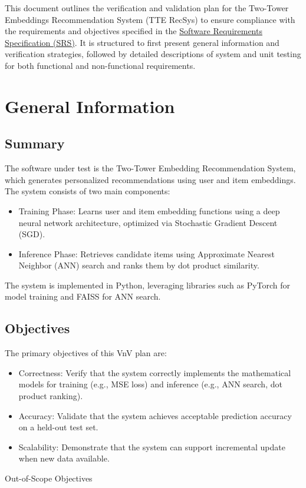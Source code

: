 \documentclass[12pt, titlepage]{article}
\begin{document}
\newpage

\nocite{*}
This document outlines the verification and validation plan for the Two-Tower Embeddings Recommendation System (TTE RecSys) to ensure compliance with the requirements and objectives specified in the \href{https://github.com/V-AS/Two-tower-recommender-system/blob/main/docs/SRS/SRS.pdf}{Software Requirements Specification (SRS)}. It is structured to first present general information and verification strategies, followed by detailed descriptions of system and unit testing for both functional and non-functional requirements.

\section{General Information}

\subsection{Summary}

The software under test is the Two-Tower Embedding Recommendation System, which generates personalized recommendations using user and item embeddings. The system consists of two main components:
\begin{itemize}
  \item Training Phase: Learns user and item embedding functions using a deep neural network architecture, optimized via Stochastic Gradient Descent (SGD).
  \item Inference Phase: Retrieves candidate items using Approximate Nearest Neighbor (ANN) search and ranks them by dot product similarity.
\end{itemize}

The system is implemented in Python, leveraging libraries such as PyTorch for model training and FAISS for ANN search.

\subsection{Objectives}
The primary objectives of this VnV plan are:
\begin{itemize}
  \item Correctness: Verify that the system correctly implements the mathematical models for training (e.g., MSE loss) and inference (e.g., ANN search, dot product ranking).
  \item Accuracy: Validate that the system achieves acceptable prediction accuracy on a held-out test set.
  \item Scalability: Demonstrate that the system can support incremental update when new data available.
\end{itemize}
\noindent Out-of-Scope Objectives
\end{document}
